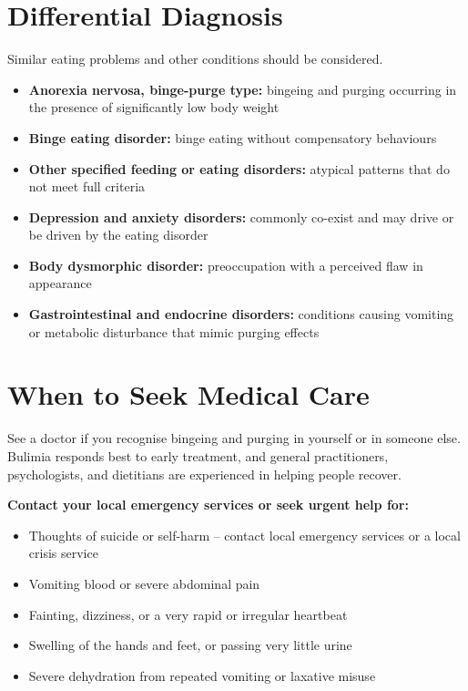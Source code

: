 \section*{Differential Diagnosis}
Similar eating problems and other conditions should be considered.

\begin{itemize}
    \item \textbf{Anorexia nervosa, binge-purge type:} bingeing and purging occurring in the presence of significantly low body weight
    \item \textbf{Binge eating disorder:} binge eating without compensatory behaviours
    \item \textbf{Other specified feeding or eating disorders:} atypical patterns that do not meet full criteria
    \item \textbf{Depression and anxiety disorders:} commonly co-exist and may drive or be driven by the eating disorder
    \item \textbf{Body dysmorphic disorder:} preoccupation with a perceived flaw in appearance
    \item \textbf{Gastrointestinal and endocrine disorders:} conditions causing vomiting or metabolic disturbance that mimic purging effects
\end{itemize}

\section*{When to Seek Medical Care}
See a doctor if you recognise bingeing and purging in yourself or in someone else. Bulimia responds best to early treatment, and general practitioners, psychologists, and dietitians are experienced in helping people recover.

\textbf{Contact your local emergency services or seek urgent help for:}
\begin{itemize}
    \item Thoughts of suicide or self-harm -- contact local emergency services or a local crisis service
    \item Vomiting blood or severe abdominal pain
    \item Fainting, dizziness, or a very rapid or irregular heartbeat
    \item Swelling of the hands and feet, or passing very little urine
    \item Severe dehydration from repeated vomiting or laxative misuse
\end{itemize}

